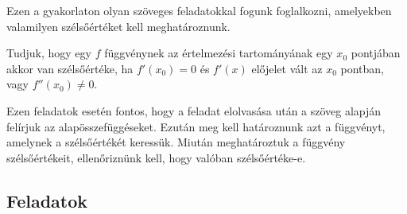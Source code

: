 \documentclass[a4paper, 12pt]{scrartcl}
\begin{document}
\begin{blueBox}

  Ezen a gyakorlaton olyan szöveges feladatokkal fogunk foglalkozni, amelyekben
  valamilyen szélsőértéket kell meghatároznunk.

  Tudjuk, hogy egy $f$ függvénynek az értelmezési tartományának egy $x_0$
  pontjában akkor van szélsőértéke, ha $f'(x_0) = 0$ és $f'(x)$ előjelet vált
  az $x_0$ pontban, vagy $f''(x_0) \neq 0$.

  Ezen feladatok esetén fontos, hogy a feladat elolvasása után a szöveg alapján
  felírjuk az alapösszefüggéseket. Ezután meg kell határoznunk azt a függvényt,
  amelynek a szélsőértékét keressük. Miután meghatároztuk a függvény
  szélsőértékeit, ellenőriznünk kell, hogy valóban szélsőértéke-e.


\end{blueBox}

\vfill

\subsection{Feladatok}
\end{document}
